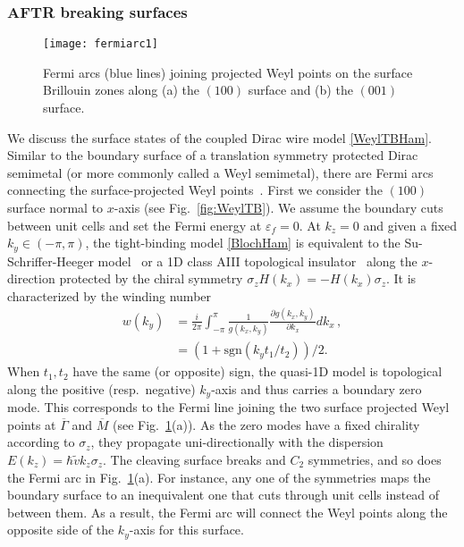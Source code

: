 \subsubsection{AFTR breaking surfaces}\label{sec:fermiarcAFTRbreaking}

\begin{figure}[htbp]
	\centering\texttt{[image: fermiarc1]}
	\caption[Fermi arcs joining projected Weyl points on the surface Brillouin zones]{Fermi arcs (blue lines) joining projected Weyl points on the surface Brillouin zones along (a) the $(100)$ surface and (b) the $(001)$ surface.}\label{fig:fermiarc1}
\end{figure}
We discuss the surface states of the coupled Dirac wire model \eqref{WeylTBHam}. Similar to the boundary surface of a translation symmetry protected Dirac semimetal (or more commonly called a Weyl semimetal), there are Fermi arcs connecting the surface-projected Weyl points~\cite{WanVishwanathSavrasovPRB11,Ashvin_Weyl_review,RMP}. First we consider the $(100)$ surface normal to $x$-axis (see Fig.~\ref{fig:WeylTB}). We assume the boundary cuts between unit cells and set the Fermi energy at $\varepsilon_f=0$. At $k_z=0$ and given a fixed $k_y\in(-\pi,\pi)$, the tight-binding model \eqref{BlochHam} is equivalent to the Su-Schriffer-Heeger model~\cite{SSH} or a 1D class AIII topological insulator~\cite{SchnyderRyuFurusakiLudwig08,Kitaevtable08} along the $x$-direction protected by the chiral symmetry $\sigma_zH(k_x)=-H(k_x)\sigma_z$. It is characterized by the winding number \begin{align}w(k_y)&=\frac{i}{2\pi}\int_{-\pi}^\pi \frac{1}{g(k_x,k_y)}\frac{\partial g(k_x,k_y)}{\partial k_x}dk_x \,, \\&=\left(1+\mathrm{sgn}(k_y t_1/t_2)\right)/2.\nonumber\end{align} When $t_1,t_2$ have the same (or opposite) sign, the quasi-1D model is topological along the positive (resp.~negative) $k_y$-axis and thus carries a boundary zero mode. This corresponds to the Fermi line joining the two surface projected Weyl points at $\overline{\Gamma}$ and $\overline{M}$ (see Fig.~\ref{fig:fermiarc1}(a)). As the zero modes have a fixed chirality according to $\sigma_z$, they propagate uni-directionally with the dispersion $E(k_z)=\hbar\tilde{v}k_z\sigma_z$. The cleaving surface breaks \AFTR and $C_2$ symmetries, and so does the Fermi arc in Fig.~\ref{fig:fermiarc1}(a). For instance, any one of the \AFTR symmetries maps the boundary surface to an inequivalent one that cuts through unit cells instead of between them. As a result, the Fermi arc will connect the Weyl points along the opposite side of the $k_y$-axis for this surface. 

